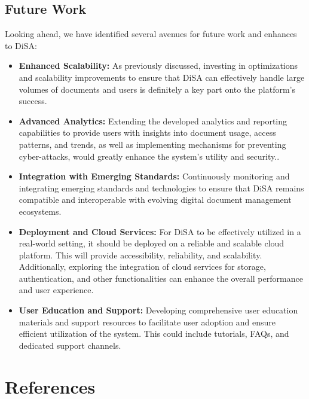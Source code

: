 \documentclass[a4paper,11pt]{article}
\begin{document}
        \pagebreak
        \subsection{Future Work}
            \quad Looking ahead, we have identified several avenues for future work and enhances to DiSA:
            \begin{itemize}
                \item \textbf{Enhanced Scalability:} As previously discussed, investing in optimizations and scalability improvements to ensure that DiSA can effectively handle large volumes of documents and users is definitely a key part onto the platform's success.
                
                \item \textbf{Advanced Analytics: } Extending the developed analytics and reporting capabilities to provide users with insights into document usage, access patterns, and trends, as well as implementing mechanisms for preventing cyber-attacks, would greatly enhance the system's utility and security..

                \item \textbf{Integration with Emerging Standards:} Continuously monitoring and integrating emerging standards and technologies to ensure that DiSA remains compatible and interoperable with evolving digital document management ecosystems.

                \item \textbf{Deployment and Cloud Services:} For DiSA to be effectively utilized in a real-world setting, it should be deployed on a reliable and scalable cloud platform. This will provide accessibility, reliability, and scalability. Additionally, exploring the integration of cloud services for storage, authentication, and other functionalities can enhance the overall performance and user experience.
    
                \item \textbf{User Education and Support:} Developing comprehensive user education materials and support resources to facilitate user adoption and ensure efficient utilization of the system. This could include tutorials, FAQs, and dedicated support channels.
            \end{itemize}

    \clearpage
    \section{References}\label{sec:references}
        \printbibliography[heading=none]
        
\end{document}
